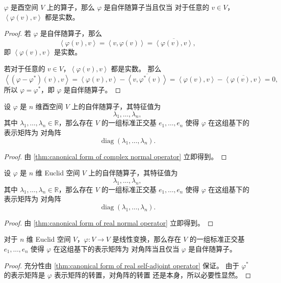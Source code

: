 \documentclass[fontset=none,zihao=-4]{Notes}
\DeclareMathOperator\diag{diag}
\newcommand{\inn}[1]{\left\langle#1\right\rangle}
\begin{document}
\begin{theorem}\label{thm:property of complex self-adjoint operator}
  $\varphi$ 是酉空间 $V$ 上的算子，那么 $\varphi$ 是自伴随算子当且仅当
  对于任意的 $v\in V$，$\inn{\varphi(v),v}$ 都是实数。
\end{theorem}
\begin{proof}
  若 $\varphi$ 是自伴随算子，那么
  \[
    \inn{\varphi(v),v}=\inn{v,\varphi(v)}=\overline{\inn{\varphi(v),v}} , 
  \]
  即 $\inn{\varphi(v),v}$ 是实数。

  若对于任意的 $v\in V$，$\inn{\varphi(v),v}$ 都是实数。
  那么
  \[
    \inn{(\varphi-\varphi^*)(v),v}=\inn{\varphi(v),v}-\overline{\inn{v,\varphi^*(v)}}
    =  \inn{\varphi(v),v}-\overline{\inn{\varphi(v),v}}=0,
  \]
  所以 $\varphi=\varphi^*$，即 $\varphi$ 是自伴随算子。
\end{proof}

\begin{theorem}[自伴随算子的酉相似]
  设 $\varphi$ 是 $n$ 维酉空间 $V$ 上的自伴随算子，其特征值为
  \[
    \lambda_1,\dots,\lambda_n,  
  \]
  其中 $\lambda_1,\dots,\lambda_n\in\mathbb{R}$，那么存在 $V$
  的一组标准正交基 $e_1,\dots,e_n$ 使得 $\varphi$ 在这组基下的表示矩阵为
  对角阵
  \[
    \diag(\lambda_1,\dots,\lambda_n)  .
  \]
\end{theorem}
\begin{proof}
  由 \autoref{thm:canonical form of complex normal operator} 立即得到。
\end{proof}

\begin{theorem}\label{thm:canonical form of real self-adjoint operator}
  设 $\varphi$ 是 $n$ 维 Euclid 空间 $V$ 上的自伴随算子，其特征值为
  \[
    \lambda_1,\dots,\lambda_n,  
  \]
  其中 $\lambda_1,\dots,\lambda_n\in\mathbb{R}$，那么存在 $V$
  的一组标准正交基 $e_1,\dots,e_n$ 使得 $\varphi$ 在这组基下的表示矩阵为
  对角阵
  \[
    \diag(\lambda_1,\dots,\lambda_n)  .
  \]
\end{theorem}
\begin{proof}
  由 \autoref{thm:canonical form of real normal operator} 立即得到。
\end{proof}

\begin{corollary}
  对于 $n$ 维 Euclid 空间 $V$，$\varphi:V\to V$ 是线性变换，那么存在 $V$ 的一组标准正交基 $e_1,\dots,e_n$ 使得 $\varphi$ 在这组基下的表示矩阵为
  对角阵当且仅当 $\varphi$ 是自伴随算子。
\end{corollary}
\begin{proof}
  充分性由 \autoref{thm:canonical form of real self-adjoint operator} 保证。
  由于 $\varphi^*$ 的表示矩阵是 $\varphi$ 表示矩阵的转置，对角阵的转置
  还是本身，所以必要性显然。
\end{proof}
\end{document}
